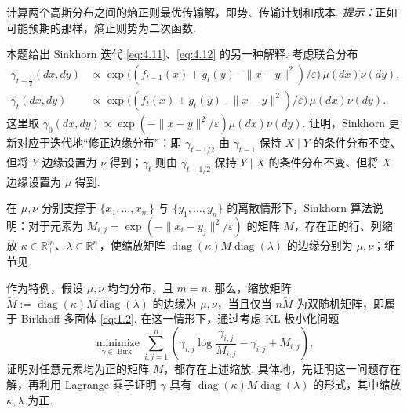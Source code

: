 \begin{exercise}\label{exer:4.4}
计算两个高斯分布之间的熵正则最优传输解，即势、传输计划和成本. \emph{提示：}正如可能预期的那样，熵正则势为二次函数.
\end{exercise}

\begin{exercise}\label{exer:4.5}
本题给出 Sinkhorn 迭代 \eqref{eq:4.11}、\eqref{eq:4.12} 的另一种解释. 考虑联合分布
$$\begin{aligned}
\gamma_{t-\frac12}(dx,dy)&\propto
\exp\bigl((f_{t-1}(x)+g_t(y)-\|x-y\|^2)/\varepsilon\bigr)\,\mu(dx)\nu(dy),\\
\gamma_t(dx,dy)&\propto
\exp\bigl((f_t(x)+g_t(y)-\|x-y\|^2)/\varepsilon\bigr)\,\mu(dx)\nu(dy).
\end{aligned}$$
这里取 $\gamma_0(dx,dy)\propto\exp(-\|x-y\|^2/\varepsilon)\mu(dx)\nu(dy)$. 证明，Sinkhorn 更新对应于迭代地“修正边缘分布”：即 $\gamma_{t-1/2}$ 由 $\gamma_{t-1}$ 保持 $X\mid Y$ 的条件分布不变、但将 $Y$ 边缘设置为 $\nu$ 得到；$\gamma_t$ 则由 $\gamma_{t-1/2}$ 保持 $Y\mid X$ 的条件分布不变、但将 $X$ 边缘设置为 $\mu$ 得到.
\end{exercise}

\begin{exercise}\label{exer:4.6}
在 $\mu,\nu$ 分别支撑于 $\{x_1,\ldots,x_m\}$ 与 $\{y_1,\ldots,y_n\}$ 的离散情形下，Sinkhorn 算法说明：对于元素为 $M_{i,j}=\exp(-\|x_i-y_j\|^2/\varepsilon)$ 的矩阵 $M$，存在正的行、列缩放 $\kappa\in\mathbb R_+^m$、$\lambda\in\mathbb R_+^n$，使缩放矩阵 $\operatorname{diag}(\kappa)M\operatorname{diag}(\lambda)$ 的边缘分别为 $\mu,\nu$；细节见\cite{ref257}.

作为特例，假设 $\mu,\nu$ 均匀分布，且 $m=n$. 那么，缩放矩阵 $\widetilde M:=\operatorname{diag}(\kappa)M\operatorname{diag}(\lambda)$ 的边缘为 $\mu,\nu$，当且仅当 $n\widetilde M$ 为双随机矩阵，即属于 Birkhoff 多面体 \eqref{eq:1.2}. 在这一情形下，通过考虑 KL 极小化问题
$$\underset{\gamma\in\operatorname{Birk}}{\operatorname{minimize}}
\sum_{i,j=1}^n\left(\gamma_{i,j}\log\frac{\gamma_{i,j}}{M_{i,j}}-\gamma_{i,j}+M_{i,j}\right),$$
证明对任意元素均为正的矩阵 $M$，都存在上述缩放. 具体地，先证明这一问题存在解，再利用 Lagrange 乘子证明 $\gamma$ 具有 $\operatorname{diag}(\kappa)M\operatorname{diag}(\lambda)$ 的形式，其中缩放 $\kappa,\lambda$ 为正.
\end{exercise}

